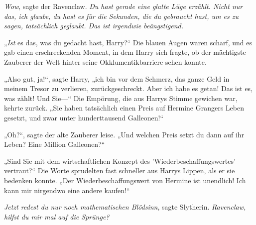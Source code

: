 \emph{Wow}, sagte der Ravenclaw. \emph{Du hast gerade eine glatte Lüge erzählt. Nicht nur das, ich glaube, du hast es für die Sekunden, die du gebraucht hast, um es zu sagen, tatsächlich geglaubt. Das ist irgendwie beängstigend.}

„\emph{Ist} es das, was du gedacht hast, Harry?“
Die blauen Augen waren scharf, und es gab einen erschreckenden Moment, in dem Harry sich fragte, ob der mächtigste Zauberer der Welt hinter seine Okklumentikbarriere sehen konnte.

„Also gut, ja!“, sagte Harry, „ich bin vor dem Schmerz, das ganze Geld in meinem Tresor zu verlieren, zurückgeschreckt. Aber ich habe es getan! Das ist es, was zählt! Und Sie—“
Die Empörung, die aus Harrys Stimme gewichen war, kehrte zurück.
„Sie haben tatsächlich einen Preis auf Hermine Grangers Leben gesetzt, und zwar unter hunderttausend Galleonen!“

„Oh?“, sagte der alte Zauberer leise. „Und welchen Preis setzt du dann auf ihr Leben? Eine Million Galleonen?“

„Sind Sie mit dem wirtschaftlichen Konzept des 'Wiederbeschaffungswertes' vertraut?“ Die Worte sprudelten fast schneller aus Harrys Lippen, als er sie bedenken konnte. „Der Wiederbeschaffungswert von Hermine ist unendlich! Ich kann mir nirgendwo eine andere kaufen!“

\emph{Jetzt redest du nur noch mathematischen Blödsinn}, sagte Slytherin. \emph{Ravenclaw, hilfst du mir mal auf die Sprünge?}

